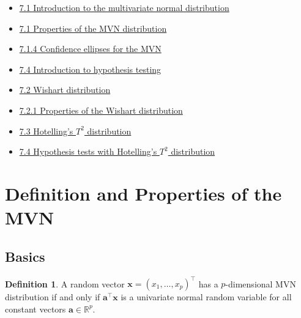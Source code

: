 \documentclass[
]{book}
\providecommand{\tightlist}{%
  \setlength{\itemsep}{0pt}\setlength{\parskip}{0pt}}
\theoremstyle{definition}
\newtheorem{definition}{Definition}[chapter]
\theoremstyle{definition}
\theoremstyle{definition}
\theoremstyle{definition}
\theoremstyle{remark}
\begin{document}
\begin{itemize}
\tightlist
\item
  \href{https://mediaspace.nottingham.ac.uk/media/Multivariate+Normal+Random+VariablesA+Introduction/1_pdjxphay}{7.1 Introduction to the multivariate normal distribution}
\item
  \href{https://mediaspace.nottingham.ac.uk/media/Multivariate+Normal+Random+VariablesA++Properties/1_j9mh4v7r}{7.1 Properties of the MVN distribution}
\item
  \href{https://mediaspace.nottingham.ac.uk/media/Multivariate+Normal+Random+VariablesA++Confidence+Ellipses/1_dlvgqoi3}{7.1.4 Confidence ellipses for the MVN}
\item
  \href{https://mediaspace.nottingham.ac.uk/media/MVN_HypothesistestIntro.mp4/1_b1gstf1h}{7.4 Introduction to hypothesis testing}
\item
  \href{https://mediaspace.nottingham.ac.uk/media/MVN_Wishart/1_3kpedgb6}{7.2 Wishart distribution}
\item
  \href{https://mediaspace.nottingham.ac.uk/media/MVN_WishartProperties/1_yfgzcsyb}{7.2.1 Properties of the Wishart distribution}
\item
  \href{https://mediaspace.nottingham.ac.uk/media/MVN_Hotelling.mp4/1_5evjeyu8}{7.3 Hotelling's \(T^2\) distribution}
\item
  \href{https://mediaspace.nottingham.ac.uk/media/Multivariate+NormalsA+Hypothesis+testing/1_bhk20k5z}{7.4 Hypothesis tests with Hotelling's \(T^2\) distribution}
\end{itemize}

\hypertarget{definition-and-properties-of-the-mvn}{%
\section{Definition and Properties of the MVN}\label{definition-and-properties-of-the-mvn}}

\hypertarget{basics}{%
\subsection{Basics}\label{basics}}

\begin{definition}
\protect\hypertarget{def:mvn}{}\label{def:mvn}A random vector \(\mathbf x=(x_1, \ldots , x_p)^\top\) has a \(p\)-dimensional MVN distribution if and only if \(\mathbf a^\top \mathbf x\) is a univariate normal random variable for all constant vectors \(\mathbf a\in \mathbb{R}^p\).
\end{definition}
\end{document}
